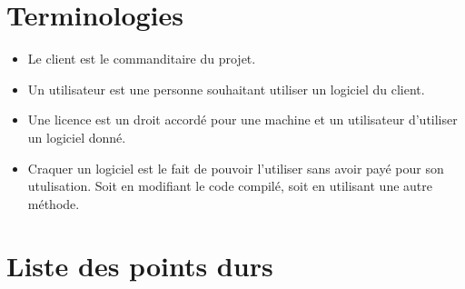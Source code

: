 \chapter{Terminologies}

\begin{itemize}
	\item Le client est le commanditaire du projet.
	\item Un utilisateur est une personne souhaitant utiliser un logiciel du client. 
	\item Une licence est un droit accordé pour une machine et un utilisateur d'utiliser un logiciel donné.
	\item Craquer un logiciel est le fait de pouvoir l'utiliser sans avoir payé pour son utulisation. Soit en modifiant le code compilé, soit en utilisant une autre méthode. 
\end{itemize}

\chapter{Liste des points durs}

